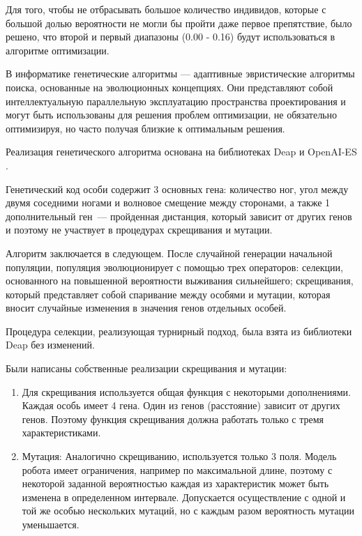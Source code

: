 Для того, чтобы не отбрасывать большое количество индивидов, которые с большой долью вероятности не могли бы пройти даже первое препятствие, было решено, что второй и первый диапазоны (0.00 - 0.16) будут использоваться в алгоритме оптимизации.

В информатике генетические алгоритмы --- адаптивные эвристические алгоритмы поиска, основанные на эволюционных концепциях. Они представляют собой интеллектуальную параллельную эксплуатацию пространства проектирования и могут быть использованы для решения проблем оптимизации, не обязательно оптимизируя, но часто получая близкие к оптимальным решения. 

Реализация генетического алгоритма основана на библиотеках Deap  и OpenAI-ES \cite{DEAP_JMLR2012,salimans_Evolution_2017}.

Генетический код особи содержит 3 основных гена: количество ног, угол между двумя соседними ногами и волновое смещение между сторонами, а также 1 дополнительный ген~--- пройденная дистанция, который зависит от других генов и поэтому не участвует в процедурах скрещивания и мутации. 

Алгоритм заключается в следующем. После случайной генерации начальной популяции, популяция эволюционирует с помощью трех операторов: селекции, основанного на повышенной вероятности выживания сильнейшего; скрещивания, который представляет собой спаривание между особями и мутации, которая вносит случайные изменения в значения генов отдельных особей.

Процедура селекции, реализующая турнирный подход, была взята из библиотеки Deap без изменений. 

Были написаны собственные реализации скрещивания и мутации:
\begin{enumerate}
\item Для скрещивания используется общая функция с некоторыми дополнениями. Каждая особь имеет 4 гена. Один из генов (расстояние) зависит от других генов. Поэтому функция скрещивания должна работать только с  тремя характеристиками.

\item Мутация: Аналогично скрещиванию, используется только 3 поля. Модель робота имеет ограничения, например по максимальной длине, поэтому с некоторой заданной вероятностью каждая из характеристик может быть изменена в определенном интервале. Допускается осуществление с одной и той же особью нескольких мутаций, но с каждым разом вероятность мутации уменьшается. 
\end{enumerate}

